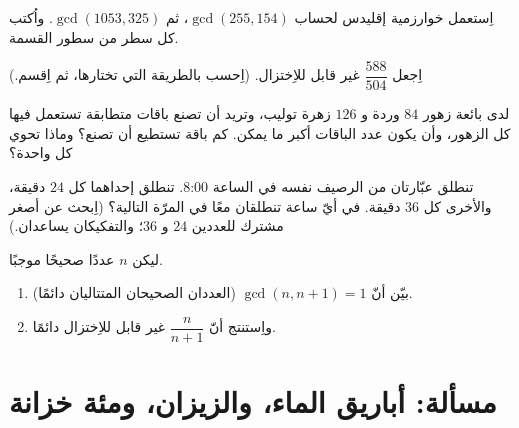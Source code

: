 \begin{exercise}[$\star\star$]\label{exo:g9:arith:6}
اِستعمل خوارزمية إقليدس لحساب $\gcd(255, 154)$، ثم
$\gcd(1053, 325)$. واُكتب كل سطر من سطور القسمة.
\end{exercise}

\begin{exercise}[$\star\star$]\label{exo:g9:arith:7}
اِجعل  $\dfrac{588}{504}$ غير قابل للاِختزال. (اِحسب  بالطريقة التي تختارها، ثم اِقسم.)
\end{exercise}

\begin{exercise}[$\star\star$]\label{exo:g9:arith:8}
لدى بائعة زهور $84$ وردة و $126$ زهرة توليب، وتريد أن تصنع باقات
متطابقة تستعمل فيها كل الزهور، وأن يكون عدد الباقات أكبر ما يمكن.
كم باقة تستطيع أن تصنع؟ وماذا تحوي كل واحدة؟
\end{exercise}

\begin{exercise}[$\star\star$]\label{exo:g9:arith:9}
تنطلق عبّارتان من الرصيف نفسه في الساعة 8:00. تنطلق إحداهما كل
$24$ دقيقة، والأخرى كل $36$ دقيقة. في أيّ ساعة تنطلقان معًا في
المرّة التالية؟ (اِبحث عن أصغر  مشترك للعددين $24$ و $36$؛
والتفكيكان يساعدان.)
\end{exercise}

\begin{exercise}[$\star\star\star$]\label{exo:g9:arith:10}
ليكن $n$ عددًا صحيحًا موجبًا.
\begin{enumerate}
  \item بيّن أنّ $\gcd(n, n+1) = 1$ (العددان الصحيحان المتتاليان
         دائمًا).
  \item واِستنتج أنّ  $\dfrac{n}{n+1}$ غير قابل للاِختزال دائمًا.
\end{enumerate}
\end{exercise}

\section{مسألة: أباريق الماء، والزيزان، ومئة خزانة}

